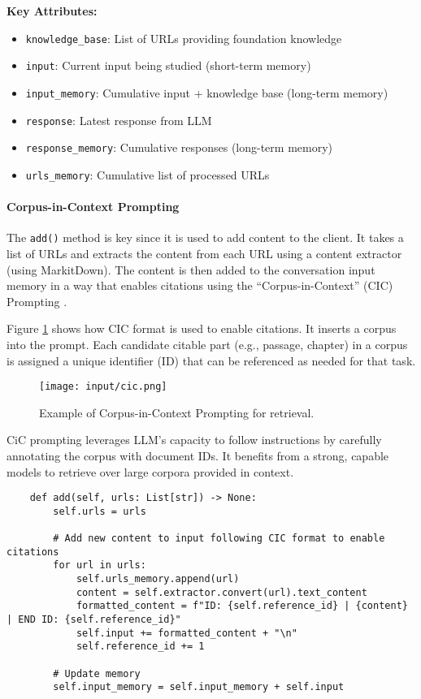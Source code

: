 \textbf{Key Attributes:}
\begin{itemize}
\item \texttt{knowledge\_base}: List of URLs providing foundation knowledge
\item \texttt{input}: Current input being studied (short-term memory)
\item \texttt{input\_memory}: Cumulative input + knowledge base (long-term memory)
\item \texttt{response}: Latest response from LLM
\item \texttt{response\_memory}: Cumulative responses (long-term memory)
\item \texttt{urls\_memory}: Cumulative list of processed URLs
\end{itemize}

\paragraph{Corpus-in-Context Prompting}

The \texttt{add()} method is key since it is used to add content to the client. It takes a list of URLs and extracts the content from each URL using a content extractor (using MarkitDown). The content is then added to the conversation input memory in a way that enables citations using the ``Corpus-in-Context'' (CIC) Prompting .

Figure \ref{fig:cic} shows how CIC format is used to enable citations. It inserts a corpus into the prompt. Each candidate citable part (e.g., passage, chapter) in a corpus is assigned a unique identifier (ID) that can be referenced as needed for that task.

\begin{figure}[H]
\centering
\texttt{[image: input/cic.png]}
\caption{Example of Corpus-in-Context Prompting for retrieval.}
\label{fig:cic}
\end{figure}

CiC prompting leverages LLM's capacity to follow instructions by carefully annotating the corpus with document IDs. It benefits from a strong, capable models to retrieve over large corpora provided in context.

\begin{verbatim}
    def add(self, urls: List[str]) -> None:
        self.urls = urls

        # Add new content to input following CIC format to enable citations
        for url in urls:
            self.urls_memory.append(url)
            content = self.extractor.convert(url).text_content
            formatted_content = f"ID: {self.reference_id} | {content} | END ID: {self.reference_id}"
            self.input += formatted_content + "\n" 
            self.reference_id += 1
        
        # Update memory
        self.input_memory = self.input_memory + self.input
\end{verbatim}

